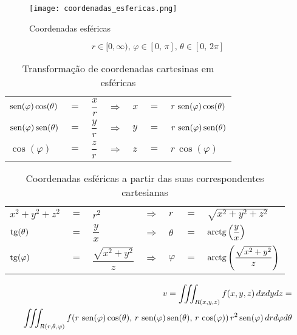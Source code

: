 	\begin{figure}[H]
		\caption{Coordenadas esféricas}
		\label{coordenadas_esfericas}
		\centering
		\texttt{[image: coordenadas\_esfericas.png]}		
	\end{figure}
	
	$$r \in [0, \infty),\, \varphi \in [0,\, \pi],\, \theta \in [0,\, 2\pi]$$
	
	\begin{table}[H]
		\caption{Transformação de coordenadas cartesinas em esféricas}
		\label{transformacao_coordenadas_cartesianas_esfericas}
		\centering		
		\begin{tabular}{|lclclcl|}
			$\operatorname{sen}(\varphi)\cos(\theta)$ & $=$ & $\dfrac{x}{r}$ & $\Rightarrow$ & $x$ & $=$ & $r\,\operatorname{sen}(\varphi)\cos(\theta)$ \\
			$\operatorname{sen}(\varphi)\operatorname{sen}(\theta)$ & $=$ & $\dfrac{y}{r}$ & $\Rightarrow$ & $y$ & $=$ & $r\,\operatorname{sen}(\varphi)\operatorname{sen}(\theta)$ \\
			$\cos(\varphi)$             & $=$ & $\dfrac{z}{r}$ & $\Rightarrow$ & $z$ & $=$ & $r\,\cos(\varphi)$
		\end{tabular}		
	\end{table}	
	\begin{table}[H]
		\caption{Coordenadas esféricas a partir das suas correspondentes cartesianas}
		\label{correpondentes_coordenadas_cartesianas_esfericas}
		\centering		
		\begin{tabular}{|lclclcl|}
			$x^2 + y^2 + z^2$ & $=$ & $r^2$                         & $\Rightarrow$ & $r$       & $=$ & $\sqrt{x^2 + y^2 + z^2}$                         \\
			$\operatorname{tg}(\theta)$     & $=$ & $\dfrac{y}{x}$                & $\Rightarrow$ & $\theta$  & $=$ & $\operatorname{arctg}\left(\dfrac{y}{x}\right)$                \\
			$\operatorname{tg}(\varphi)$    & $=$ & $\dfrac{\sqrt{x^2 + y^2}}{z}$ & $\Rightarrow$ & $\varphi$ & $=$ & $\operatorname{arctg}\left(\dfrac{\sqrt{x^2 + y^2}}{z}\right)$
		\end{tabular}		
	\end{table}
	
	\begin{align*}
		v = \iiint_{R(x,y,z)} f(x,y,z)\, dxdydz =\\ \iiint_{R(r,\theta,\varphi)} f(r\,\operatorname{sen}(\varphi)\cos(\theta),\, r\,\operatorname{sen}(\varphi)\operatorname{sen}(\theta),\, r\,\cos(\varphi))\, r^2\operatorname{sen}(\varphi)\, dr d\varphi d\theta
	\end{align*}